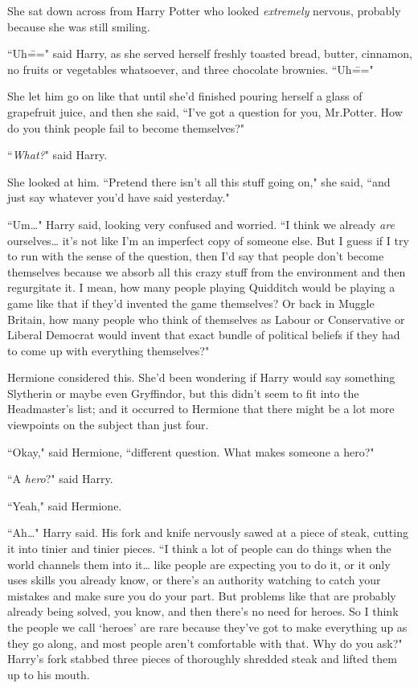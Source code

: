 She sat down across from Harry Potter who looked \emph{extremely} nervous, probably because she was still smiling.

``Uh\===" said Harry, as she served herself freshly toasted bread, butter, cinnamon, no fruits or vegetables whatsoever, and three chocolate brownies. ``Uh\==="

She let him go on like that until she'd finished pouring herself a glass of grapefruit juice, and then she said, ``I've got a question for you, Mr.\?Potter. How do you think people fail to become themselves?"

``\emph{What?}" said Harry.

She looked at him. ``Pretend there isn't all this stuff going on," she said, ``and just say whatever you'd have said yesterday."

``Um{\ldots}" Harry said, looking very confused and worried. ``I think we already \emph{are} ourselves{\ldots} it's not like I'm an imperfect copy of someone else. But I guess if I try to run with the sense of the question, then I'd say that people don't become themselves because we absorb all this crazy stuff from the environment and then regurgitate it. I mean, how many people playing Quidditch would be playing a game like that if they'd invented the game themselves? Or back in Muggle Britain, how many people who think of themselves as Labour or Conservative or Liberal Democrat would invent that exact bundle of political beliefs if they had to come up with everything themselves?"

Hermione considered this. She'd been wondering if Harry would say something Slytherin or maybe even Gryffindor, but this didn't seem to fit into the Headmaster's list; and it occurred to Hermione that there might be a lot more viewpoints on the subject than just four.

``Okay," said Hermione, ``different question. What makes someone a hero?"

``A \emph{hero}?" said Harry.

``Yeah," said Hermione.

``Ah{\ldots}" Harry said. His fork and knife nervously sawed at a piece of steak, cutting it into tinier and tinier pieces. ``I think a lot of people can do things when the world channels them into it{\ldots} like people are expecting you to do it, or it only uses skills you already know, or there's an authority watching to catch your mistakes and make sure you do your part. But problems like that are probably already being solved, you know, and then there's no need for heroes. So I think the people we call `heroes' are rare because they've got to make everything up as they go along, and most people aren't comfortable with that. Why do you ask?" Harry's fork stabbed three pieces of thoroughly shredded steak and lifted them up to his mouth.

